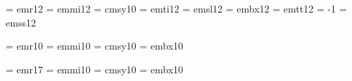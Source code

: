  \font\twlrm  = emr12		%
 \font\twlmi  = emmi12		%
    \skewchar{}	%
 \font\twlsy  = cmsy10		%
    \skewchar{}		%
 \font\twlit  = emti12		%
 \font\twlsl  = emsl12		%
 \font\twlbf  = embx12		%
 \font\twltt  = emtt12		%
    \hyphenchar\twltt = -1	%
 \font\twlsf  = emss12		%

 \font\frtnrm  = emr10		%
 \font\frtnmi  = emmi10		%
    \skewchar{}	%
 \font\frtnsy  = cmsy10		%
    \skewchar{}	%
 \font\frtnbf  = embx10		%

 \font\svtnrm  = emr17			%
 \font\svtnmi  = emmi10		%
    \skewchar{}	%
 \font\svtnsy  = cmsy10		%
    \skewchar{}	%
 \font\svtnbf  = embx10		%


